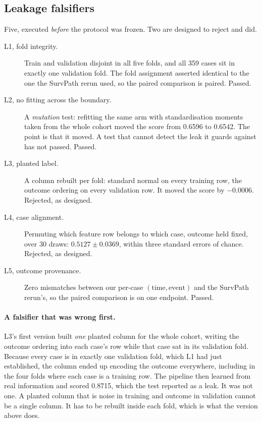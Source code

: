 \subsection*{Leakage falsifiers}

Five, executed \emph{before} the protocol was frozen. Two are designed to reject and did.

\begin{description}
  \item[L1, fold integrity.] Train and validation disjoint in all five folds, and all 359 cases sit in
    exactly one validation fold. The fold assignment asserted identical to the one the SurvPath
    rerun used, so the paired comparison is paired. Passed.
  \item[L2, no fitting across the boundary.] A \emph{mutation} test: refitting the same arm with
    standardisation moments taken from the whole cohort moved the score from 0.6596 to 0.6542. The
    point is that it moved. A test that cannot detect the leak it guards against has not passed.
    Passed.
  \item[L3, planted label.] A column rebuilt per fold: standard normal on every training row, the
    outcome ordering on every validation row. It moved the score by $-0.0006$. Rejected, as
    designed.
  \item[L4, case alignment.] Permuting which feature row belongs to which case, outcome held fixed,
    over 30 draws: $0.5127 \pm 0.0369$, within three standard errors of chance.
    Rejected, as designed.
  \item[L5, outcome provenance.] Zero mismatches between our per-case $(\text{time}, \text{event})$
    and the SurvPath rerun's, so the paired comparison is on one endpoint. Passed.
\end{description}

\paragraph{A falsifier that was wrong first.} L3's first version built \emph{one} planted column for
the whole cohort, writing the outcome ordering into each case's row while that case sat in its
validation fold. Because every case is in exactly one validation fold, which L1 had just established, the column ended up encoding the outcome everywhere, including in the four folds
where each case is a training row. The pipeline then learned from real information and scored
0.8715, which the test reported as a leak. It was not one. A planted column that is noise in
training and outcome in validation cannot be a single column. It has to be rebuilt inside each fold,
which is what the version above does.

